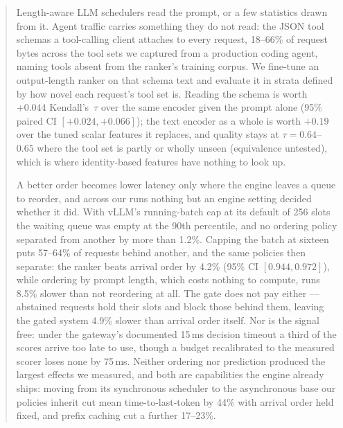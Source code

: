 %
\begin{abstract}
Length-aware LLM schedulers read the prompt, or a few statistics drawn from
it. Agent traffic carries something they do not read: the JSON tool schemas a
tool-calling client attaches to every request, 18--66\% of request bytes
across the tool sets we captured from a production coding agent, naming
tools absent from the
ranker's training corpus. We fine-tune an output-length ranker on that schema
text and evaluate it in strata defined by how novel each request's tool set
is. Reading the schema is worth $+0.044$ Kendall's~$\tau$ over the same
encoder given the prompt alone (95\% paired CI $[+0.024, +0.066]$); the text
encoder as a whole is worth $+0.19$ over the tuned scalar features it
replaces, and quality stays at $\tau{=}0.64$--$0.65$ where the tool set is
partly or wholly unseen (equivalence untested), which is where identity-based
features have nothing to look up.

A better order becomes lower latency only where the engine leaves a queue to
reorder, and across our runs nothing but an engine setting decided whether it
did. With vLLM's running-batch cap at its default of 256 slots the waiting
queue was empty at the 90th percentile, and no ordering policy separated from
another by more than 1.2\%. Capping the batch at sixteen puts 57--64\% of
requests behind another, and the same policies then separate: the ranker
beats arrival order by 4.2\% (95\% CI $[0.944, 0.972]$), while ordering by
prompt length, which costs nothing to compute, runs 8.5\% slower than not
reordering at all. The gate does not pay either --- abstained requests hold
their slots and block those behind them, leaving the gated system 4.9\%
slower than arrival order itself. Nor is the signal free: under the gateway's
documented 15\,ms decision timeout a third of the scores arrive too late to
use, though a budget recalibrated to the measured scorer loses none by
75\,ms. Neither ordering nor prediction produced the largest effects we
measured, and both are capabilities the engine already ships: moving from
its synchronous scheduler to the asynchronous base our policies inherit cut
mean time-to-last-token by 44\% with arrival order held fixed, and prefix
caching cut a further 17--23\%.
\end{abstract}
